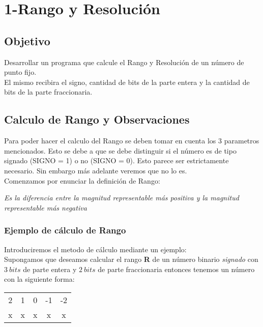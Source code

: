 
%

\chapter*{1-Rango y Resoluci\'on}

\section{Objetivo}
\indent\indent  Desarrollar un programa que calcule el Rango y Resoluci\'on de un n\'umero de punto fijo.\\
\indent El mismo recibira el signo, cantidad de bits de la parte entera y la cantidad de bits de la parte fraccionaria.
\section{Calculo de Rango y Observaciones}
\indent\indent Para poder hacer el calculo del Rango se deben tomar en cuenta los 3 parametros mencionados. Esto se debe a que se debe distinguir si el n\' umero es de tipo signado (SIGNO = 1) o no (SIGNO = 0). Esto parece ser estrictamente necesario. Sin embargo m\'as adelante veremos que no lo es.
\\ \indent Comenzamos por enunciar la definici\'on de Rango:\\
	\begin{center}
	\emph{Es la diferencia entre la magnitud representable m\'as positiva y la magnitud representable m\'as negativa}
	\end{center}

\subsection{Ejemplo de c\'alculo de Rango}
\indent\indent Introduciremos el metodo de c\'alculo mediante un ejemplo:\\
\indent Supongamos que deseamos calcular el rango \textbf{R} de un n\'umero binario \textit{signado} con $3\ bits$ de parte entera y $2\ bits$ de parte fraccionaria entonces tenemos un n\'umero con la siguiente forma:



\begin{center}
\begin{tabular}{ |c|c|c|c|c| } 
 \hline
 2 & 1 & 0 & -1 & -2 \\ 
 x & x & x  & x & x\\ 
 \hline
\end{tabular}
\end{center}

